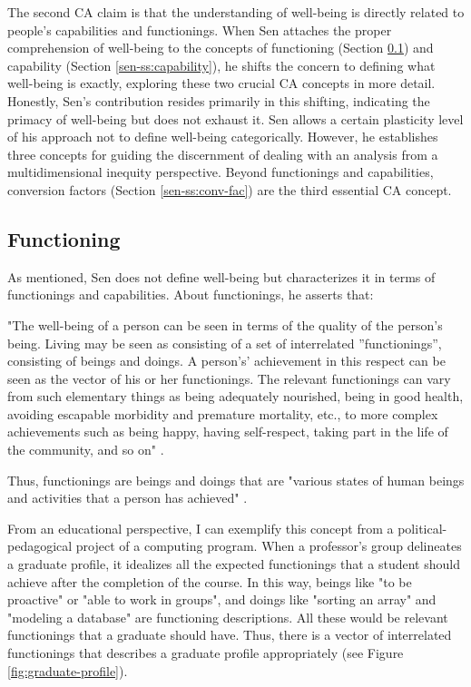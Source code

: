 The second \gls{CA} claim is that the understanding of well-being is directly related to people's capabilities and functionings. When Sen attaches the proper comprehension of well-being to the concepts of functioning (Section \ref{sen-ss:functioning}) and capability (Section \ref{sen-ss:capability}), he shifts the concern to defining what well-being is exactly, exploring these two crucial \gls{CA} concepts in more detail. Honestly, Sen's contribution resides primarily in this shifting, indicating the primacy of well-being but does not exhaust it. Sen allows a certain plasticity level of his approach not to define well-being categorically. However, he establishes three concepts for guiding the discernment of dealing with an analysis from a multidimensional inequity perspective. Beyond functionings and capabilities, conversion factors (Section \ref{sen-ss:conv-fac}) are the third essential \gls{CA} concept.

\subsection{Functioning}
\label{sen-ss:functioning}

As mentioned, Sen does not define well-being but characterizes it in terms of functionings and capabilities. About functionings, he asserts that:
\begin{citacao}
    "The well-being of a person can be seen in terms of the quality of the person's being. Living may be seen as consisting of a set of interrelated ''functionings'', consisting of beings and doings. A person's' achievement in this respect can be seen as the vector of his or her functionings. The relevant functionings can vary from such elementary things as being adequately nourished, being in good health, avoiding escapable morbidity and premature mortality, etc., to more complex achievements such as being happy, having self-respect, taking part in the life of the community, and so on" \cite[p.~39]{sen:1992}.
\end{citacao}
Thus, functionings are beings and doings that are "various states of human beings and activities that a person has achieved" \cite{robeyns:2023}.

From an educational perspective, I can exemplify this concept from a political-pedagogical project of a computing program. When a professor's group delineates a graduate profile, it idealizes all the expected functionings that a student should achieve after the completion of the course. In this way, beings like "to be proactive" or "able to work in groups", and doings like "sorting an array" and "modeling a database" are functioning descriptions. All these would be relevant functionings that a graduate should have. Thus, there is a vector of interrelated functionings that describes a graduate profile appropriately (see Figure \ref{fig:graduate-profile}).

